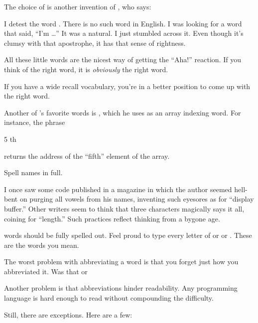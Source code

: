 %
\begin{interview}
The choice of  is another invention of , who
says:

\begin{tfquot}
I detest the word . There is no such word in English.  I
was looking for a word that said, ``I'm \dots{}'' It was a natural.
I just stumbled across it.  Even though it's clumsy with that
apostrophe, it has that sense of rightness.

All these little words are the nicest way of getting the ``Aha!''
reaction.  If you think of the right word, it is \emph{obviously} the
right word.

If you have a wide recall vocabulary, you're in a better position to
come up with the right word.
\end{tfquot}
\end{interview}%
Another of 's favorite words is , which he
uses as an array indexing word.  For instance, the phrase
\begin{Code}
5 th
\end{Code}
returns the address of the ``fifth'' element of the array.%

%
\begin{tip}
Spell names in full.
\end{tip}
I once saw some \Forth{} code published in a magazine in which the
author seemed hell-bent on purging all vowels from his names,
inventing such eyesores as  for ``display buffer.''
Other writers seem to think that three characters magically says it
all, coining  for ``length.'' Such practices reflect
thinking from a bygone age.

%
\Forth{} words should be fully spelled out.  Feel proud to type every
letter of  or  or .
These are the words you mean.

The worst problem with abbreviating a word is that you forget just
how you abbreviated it.  Was that  or 

Another problem is that abbreviations hinder readability.
Any programming language is hard enough to read without compounding
the difficulty.

Still, there are exceptions.  Here are a few:


